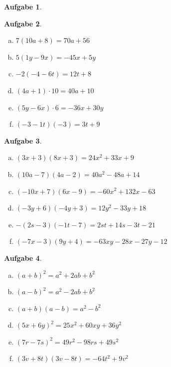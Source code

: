 \documentclass[12pt,fleqn]{article}
\theoremstyle{aufg}
\newtheorem{aufgabe}{Aufgabe}
\theoremstyle{bsp}
\begin{document}
\begin{flushleft}
\begin{aufgabe}
\begin{multicols}{2}
\begin{enumerate}[a)]
\end{enumerate} 
\end{multicols} 
\end{aufgabe} 
\begin{aufgabe} ~ \\ 
\begin{multicols}{3} 
\begin{enumerate}[a)] 
\item 
$7(10a+8)=70 a + 56$
\item 
$5(1y-9x)=- 45 x + 5 y$
\item 
$-2(-4-6t)=12 t + 8$
\item 
$(4a+1)\cdot 10=40 a + 10$
\item 
$(5y-6x)\cdot 6=- 36 x + 30 y$
\item 
$(-3-1t)(-3)=3 t + 9$
\end{enumerate} 
\end{multicols} 
\end{aufgabe} 
\begin{aufgabe} ~ \\ 
\begin{multicols}{3} 
\begin{enumerate}[a)] 
\item 
$(3x+3)(8x+3)=24 x^{2} + 33 x + 9$
\item 
$(10a-7)(4a-2)=40 a^{2} - 48 a + 14$
\item 
$(-10x+7)(6x-9)=- 60 x^{2} + 132 x - 63$
\item 
$(-3y+6)(-4y+3)=12 y^{2} - 33 y + 18$
\item 
$-(2s-3)(-1t-7)=2 s t + 14 s - 3 t - 21$
\item 
$(-7x-3)(9y+4)=- 63 x y - 28 x - 27 y - 12$
\end{enumerate} 
\end{multicols} 
\end{aufgabe} 
\begin{aufgabe} ~ \\ 
\begin{multicols}{3} 
\begin{enumerate}[a)] 
\item 
$(a+b)^2=a^{2} + 2 a b + b^{2}$
\item 
$(a-b)^2=a^{2} - 2 a b + b^{2}$
\item 
$(a+b)(a-b)=a^{2} - b^{2}$
\item 
$(5x+6y)^2=25 x^{2} + 60 x y + 36 y^{2}$
\item 
$(7r-7s)^2=49 r^{2} - 98 r s + 49 s^{2}$
\item 
$(3v+8t)(3v-8t)=- 64 t^{2} + 9 v^{2}$

\end{enumerate}
\end{multicols}
\end{aufgabe}
\end{flushleft}
\end{document}
